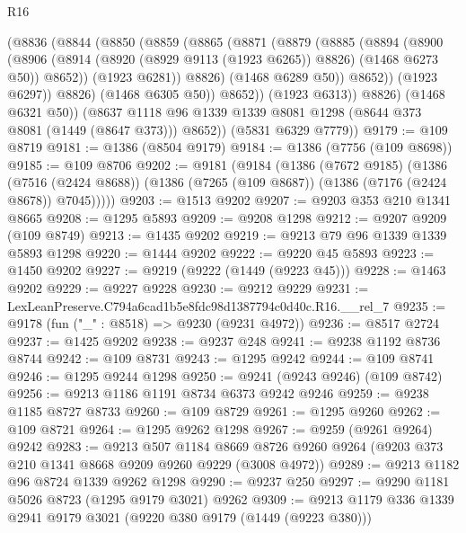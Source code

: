 \begin{lexlean}{R16}
\begin{coremodule}
                (@8836
                  (@8844
                    (@8850
                      (@8859
                        (@8865
                          (@8871
                            (@8879
                              (@8885
                                (@8894
                                  (@8900
                                    (@8906
                                      (@8914
                                        (@8920 (@8929 @9113 (@1923 @6265)) @8826)
                                        (@1468 @6273 @50))
                                      @8652))
                                  (@1923 @6281))
                                @8826)
                              (@1468 @6289 @50))
                            @8652))
                        (@1923 @6297))
                      @8826)
                    (@1468 @6305 @50))
                  @8652))
              (@1923 @6313))
            @8826)
          (@1468 @6321 @50))
        (@8637 @1118 @96 @1339 @1339 @8081 @1298 (@8644 @373 @8081 (@1449 (@8647 @373))) @8652))
      (@5831 @6329 @7779))
@9179 := @109 @8719
@9181 := @1386 (@8504 @9179)
@9184 := @1386 (@7756 (@109 @8698))
@9185 := @109 @8706
@9202 := @9181
    (@9184
      (@1386
        (@7672 @9185)
        (@1386
          (@7516 (@2424 @8688))
          (@1386 (@7265 (@109 @8687)) (@1386 (@7176 (@2424 @8678)) @7045)))))
@9203 := @1513 @9202
@9207 := @9203 @353 @210 @1341 @8665
@9208 := @1295 @5893
@9209 := @9208 @1298
@9212 := @9207 @9209 (@109 @8749)
@9213 := @1435 @9202
@9219 := @9213 @79 @96 @1339 @1339 @5893 @1298
@9220 := @1444 @9202
@9222 := @9220 @45 @5893
@9223 := @1450 @9202
@9227 := @9219 (@9222 (@1449 (@9223 @45)))
@9228 := @1463 @9202
@9229 := @9227 @9228
@9230 := @9212 @9229
@9231 := LexLeanPreserve.C794a6cad1b5e8fdc98d1387794c0d40c.R16.__rel_7
@9235 := @9178 (fun ("_" : @8518) => @9230 (@9231 @4972))
@9236 := @8517 @2724
@9237 := @1425 @9202
@9238 := @9237 @248
@9241 := @9238 @1192 @8736 @8744
@9242 := @109 @8731
@9243 := @1295 @9242
@9244 := @109 @8741
@9246 := @1295 @9244 @1298
@9250 := @9241 (@9243 @9246) (@109 @8742)
@9256 := @9213 @1186 @1191 @8734 @6373 @9242 @9246
@9259 := @9238 @1185 @8727 @8733
@9260 := @109 @8729
@9261 := @1295 @9260
@9262 := @109 @8721
@9264 := @1295 @9262 @1298
@9267 := @9259 (@9261 @9264) @9242
@9283 := @9213
    @507
    @1184
    @8669
    @8726
    @9260
    @9264
    (@9203 @373 @210 @1341 @8668 @9209 @9260 @9229 (@3008 @4972))
@9289 := @9213 @1182 @96 @8724 @1339 @9262 @1298
@9290 := @9237 @250
@9297 := @9290 @1181 @5026 @8723 (@1295 @9179 @3021) @9262
@9309 := @9213 @1179 @336 @1339 @2941 @9179 @3021 (@9220 @380 @9179 (@1449 (@9223 @380)))

\end{coremodule}
\end{lexlean}
